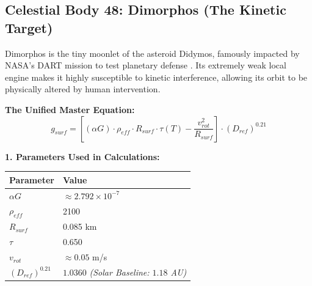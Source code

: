 \documentclass[11pt, a4paper]{article}
\begin{document}
\clearpage
\subsection{Celestial Body 48: Dimorphos (The Kinetic Target)}
  Dimorphos is the tiny moonlet of the asteroid Didymos, famously impacted by NASA's DART mission to test planetary defense \cite{daly2023}. Its extremely weak local engine makes it highly susceptible to kinetic interference, allowing its orbit to be physically altered by human intervention.

  \vspace{0.5em}
  \noindent \textbf{The Unified Master Equation:}
  $$ g_{surf} = \left[ (\alpha G) \cdot \rho_{eff} \cdot R_{surf} \cdot \tau(T) - \frac{v_{rot}^2}{R_{surf}} \right] \cdot (D_{ref})^{0.21} $$

  \vspace{0.5em}
  \noindent \textbf{1. Parameters Used in Calculations:} \\[0.5em]
  \begingroup
  \renewcommand{\arraystretch}{1.3}
  \hspace*{2em}
  \begin{tabular}{|l|l|}
    \hline
    \textbf{Parameter} & \textbf{Value} \\ \hline
    $\alpha G$ & $\approx 2.792 \times 10^{-7}$ \\ \hline
    $\rho_{eff}$ & 2100 \\ \hline
    $R_{surf}$ & 0.085 km \\ \hline
    $\tau$ & 0.650 \\ \hline
    $v_{rot}$ & $\approx 0.05$ m/s \\ \hline
    $(D_{ref})^{0.21}$ & $1.0360$ \textit{(Solar Baseline: $1.18$ AU)} \\ \hline
  \end{tabular}
  \endgroup
\end{document}
